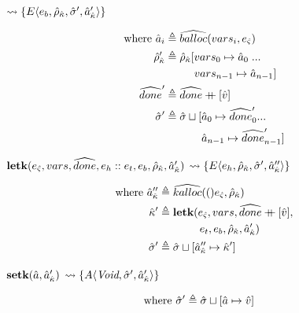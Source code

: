 \documentclass[12pt,draft]{article}
\newcommand\mdoubleplus{\ensuremath{\mathbin{+\mkern-9mu+}}}
\begin{document}
\begin{multicols*}{2}
\begin{center}
  $\leadsto \{E\langle e_b , \hat{\rho}_{\hat{\kappa}} , \hat{\sigma}' , \hat{a}_{\hat{\kappa}}' \rangle\}$
\end{center}
\vspace{-7mm}
\begin{align*}
  \text{where }
  \abaddr_i &\triangleq \aballoc{vars_i , \ectrl} \\
  \aenv_{\akont}' &\triangleq \aenv_{\akont}[vars_0 \mapsto \abaddr_0\;... \\
            &\;\;\;\;\;\;\;\;\;\, vars_{n-1} \mapsto \abaddr_{n-1}] \\
  \adone' &\triangleq \adone \mdoubleplus [\aval] \\
  \astore' &\triangleq \astore \sqcup [\abaddr_0 \mapsto \adone'_0 ... \\
  &\;\;\;\;\;\;\;\;\;\;\;\; \abaddr_{n-1} \mapsto \adone'_{n-1}]
\end{align*}
\begin{center}
  $\textbf{letk}(e_{\hat{\varsigma}} , vars , \widehat{done} , e_h::e_t , e_b,\hat{\rho}_{\hat{\kappa}} , \hat{a}_{\hat{\kappa}}')$
  $\leadsto \{E\langle e_h , \hat{\rho}_{\hat{\kappa}} , \hat{\sigma}' , \hat{a}_{\hat{\kappa}}'' \rangle\}$
\end{center}
\vspace{-7mm}
\begin{align*}
  \text{where }
  \akaddr'' &\triangleq \akalloc(\ectrl, \aenv_{\akont}) \\
  \akont' &\triangleq \textbf{letk}(\ectrl, vars , \adone \mdoubleplus [\aval], \\
  &\;\;\;\;\;\;\;\;\;\;\;\;\;\, e_t , e_b , \aenv_{\akont} , \akaddr') \\
  \astore' &\triangleq \astore \sqcup [\akaddr'' \mapsto \akont']
\end{align*}
\begin{center}
  $\textbf{setk}(\hat{a} , \hat{a}_{\hat{\kappa}}')$
  $\leadsto \{A\langle \textit{Void} , \hat{\sigma}' , \hat{a}_{\hat{\kappa}}' \rangle\}$
\end{center}
\vspace{-7mm}
\begin{align*}
  \text{where }
  \hat{\sigma}' &\triangleq \hat{\sigma} \sqcup [ \hat{a} \mapsto \hat{v} ]
\end{align*}

\vfill\null
\columnbreak



\end{multicols*}
\end{document}
